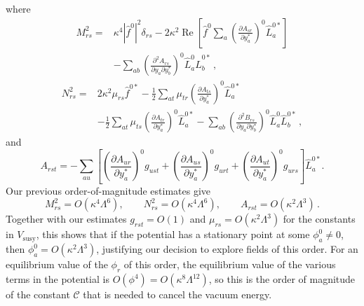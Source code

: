 where
\begin{equation}
  \begin{aligned}
  M_{rs}^2={}&
  \kappa^4|\widehat f^0|^2\delta_{rs}
  -2\kappa^2\operatorname{Re}\left[
    \widehat f^0\sum_a
    \left(\frac{\partial A_{sr}}{\partial y_a^*}\right)^0
    \widehat L_a^{0*}
  \right]
  \\
  &-\sum_{ab}
    \left(\frac{\partial^2A_{rs}}
      {\partial y_a\partial y_b^*}\right)^0
    \widehat L_a^0\widehat L_b^{0*}\,,
  \end{aligned}
  \tag{31.7.45}\label{eq:31.7.45}
\end{equation}
\begin{equation}
  \begin{aligned}
  N_{rs}^2={}&
  2\kappa^2\mu_{rs}\widehat f^{0*}
  -\frac12\sum_{at}\mu_{tr}
    \left(\frac{\partial A_{ts}}{\partial y_a^*}\right)^0
    \widehat L_a^{0*}
  \\
  &-\frac12\sum_{at}\mu_{ts}
    \left(\frac{\partial A_{tr}}{\partial y_a^*}\right)^0
    \widehat L_a^{0*}
  -\sum_{ab}
    \left(\frac{\partial^2B_{rs}}
      {\partial y_a\partial y_b^*}\right)^0
    \widehat L_a^0\widehat L_b^{0*}\,,
  \end{aligned}
  \tag{31.7.46}\label{eq:31.7.46}
\end{equation}
and
\begin{equation}
  A_{rst}
  =-\sum_{au}\left[
    \left(\frac{\partial A_{ur}}{\partial y_a^*}\right)^0g_{ust}
   +\left(\frac{\partial A_{us}}{\partial y_a^*}\right)^0g_{urt}
   +\left(\frac{\partial A_{ut}}{\partial y_a^*}\right)^0g_{urs}
  \right]\widehat L_a^{0*}.
  \tag{31.7.47}\label{eq:31.7.47}
\end{equation}
Our previous order-of-magnitude estimates give
\begin{equation}
  M_{rs}^2=O(\kappa^4\Lambda^6),\qquad
  N_{rs}^2=O(\kappa^4\Lambda^6),\qquad
  A_{rst}=O(\kappa^2\Lambda^3)\,.
  \tag{31.7.48}\label{eq:31.7.48}
\end{equation}
Together with our estimates \(g_{rst}=O(1)\) and
\(\mu_{rs}=O(\kappa^2\Lambda^3)\) for the constants in
\(V_{\mathrm{susy}}\), this shows that if the potential has a stationary
point at some \(\phi_a^0\ne0\), then
\(\phi_a^0=O(\kappa^2\Lambda^3)\), justifying our decision to explore fields
of this order. For an equilibrium value of the \(\phi_r\) of this order, the
equilibrium value of the various terms in the potential is
\(O(\phi^4)=O(\kappa^8\Lambda^{12})\), so this is the order of magnitude of
the constant \(\mathcal C\) that is needed to cancel the vacuum energy.


